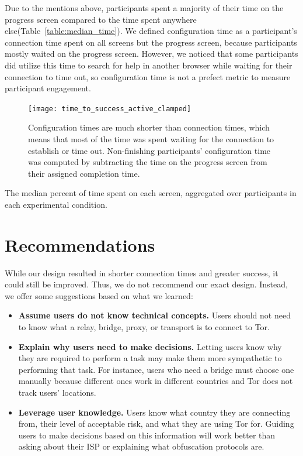 \documentclass[USenglish,oneside,twocolumn]{article}
\begin{document}
Due to the mentions above, participants spent a majority of their time on the progress screen compared to the time spent anywhere else(Table~\ref{table:median_time}). We defined configuration time as a participant's connection time spent on all screens but the progress screen, because participants mostly waited on the progress screen. However, we noticed that some participants did utilize this time to search for help in another browser while waiting for their connection to time out, so configuration time is not a prefect metric to measure participant engagement. 

\begin{figure}[t]
\centering
\texttt{[image: time\_to\_success\_active\_clamped]}
\caption{
Configuration times are much shorter than connection times, which means that most of the time was spent waiting for the connection to establish or time out. Non-finishing participants' configuration time was computed by subtracting the time on the progress screen from their assigned completion time.
}
\label{fig:time_to_success_active_clamped}
\end{figure}

\begin{table}[t]
\centering

\caption{
The median percent of time spent on each screen, aggregated over participants in each experimental condition.}
\label{table:median_time}
\end{table}


\section{Recommendations}
\label{sec:recommendations}
While our design resulted in shorter connection times and greater success, it could still be improved. Thus, we do not recommend our exact design. Instead, we offer some suggestions based on what we learned: \\
 
\begin{itemize}
\item {\bfseries Assume users do not know technical concepts.} Users should not need to know what a relay, bridge, proxy, or transport is to connect to Tor. 
\item {\bfseries Explain why users need to make decisions.} Letting users know why they are required to perform a task may make them more sympathetic to  performing that task. For instance, users who need a bridge must choose one manually because different ones work in different countries and Tor does not track users' locations.  
\item {\bfseries Leverage user knowledge.} Users know what country they are connecting from, their level of acceptable risk, and what they are using Tor for. Guiding users to make decisions based on this information will work better than asking about their ISP or explaining what obfuscation protocols are. 
\end{itemize}
\end{document}
